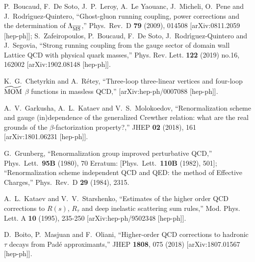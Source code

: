 \documentclass[aps,nofootinbib,showkeys,noshowpacs,preprintnumbers,amsmath,amssymb]{revtex4}
\begin{document}
\begin{thebibliography}{99}
  P.~Boucaud, F.~De Soto, J.~P.~Leroy, A.~Le Yaouanc, J.~Micheli, O.~Pene and J.~Rodr\'{\i}guez-Quintero,
  ``Ghost-gluon running coupling, power corrections and the determination of $\Lambda_{\overline {\rm MS}}$,''
  Phys.\ Rev.\ D {\bf 79} (2009), 014508
  [arXiv:0811.2059 [hep-ph]];
S.~Zafeiropoulos, P.~Boucaud, F.~De Soto, J.~Rodr\'{\i}guez-Quintero and J.~Segovia,
``Strong running coupling from the gauge sector of domain wall Lattice QCD with physical quark masses,''
Phys. Rev. Lett. \textbf{122} (2019) no.16, 162002
[arXiv:1902.08148 [hep-ph]].


  K.~G.~Chetyrkin and A.~R\'etey,
  ``Three-loop three-linear vertices and four-loop ${\widetilde {\rm MOM}}$ $\beta$ functions in massless QCD,''
 [arXiv:hep-ph/0007088 [hep-ph]].

A.~V.~Garkusha, A.~L.~Kataev and V.~S.~Molokoedov,
``Renormalization scheme and gauge (in)dependence of the generalized Crewther relation: what are the real grounds of the $\beta$-factorization property?,''
JHEP \textbf{02} (2018), 161
[arXiv:1801.06231 [hep-ph]].

  G.~Grunberg,
  ``Renormalization group improved perturbative QCD,''
  Phys.\ Lett.\  {\bf 95B} (1980), 70
  Erratum: [Phys.\ Lett.\  {\bf 110B} (1982), 501];
  ``Renormalization scheme independent QCD and QED: the method of Effective Charges,''
  Phys.\ Rev.\ D {\bf 29} (1984), 2315.

  A.~L.~Kataev and V.~V.~Starshenko,
  ``Estimates of the higher order QCD corrections to $R(s)$, $R_{\tau}$ and deep inelastic scattering sum rules,''
Mod. Phys. Lett. A \textbf{10} (1995), 235-250
[arXiv:hep-ph/9502348 [hep-ph]].

  D.~Boito, P.~Masjuan and F.~Oliani,
  ``Higher-order QCD corrections to hadronic $\tau$ decays from Pad\'e approximants,''
  JHEP {\bf 1808}, 075 (2018)
  [arXiv:1807.01567 [hep-ph]].


\end{thebibliography}
\end{document}
